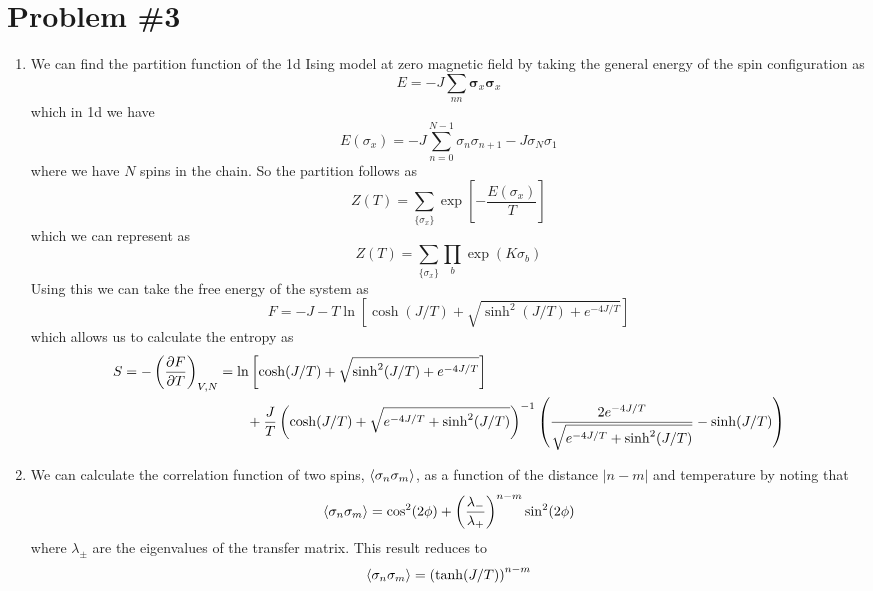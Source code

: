 \documentclass[11pt]{article}
\numberwithin{equation}{section}
\begin{document}
\section{Problem \#3}
\begin{enumerate}[(1)]
\item We can find the partition function of the 1d Ising model at zero magnetic field by taking
the general energy of the spin configuration as
$$E = - J\sum_{nn}\pmb{\sigma}_x\pmb{\sigma}_x$$
which in 1d we have
$$E(\sigma_x) = -J\sum_{n=0}^{N-1}\sigma_{n}\sigma_{n+1}-J\sigma_{N}\sigma_{1}$$
where we have $N$ spins in the chain. So the partition follows as
$$Z(T) = \sum_{\{\sigma_x\}}\exp\left[-\frac{E(\sigma_x)}{T}\right]$$
which we can represent as
$$Z(T) = \sum_{\{\sigma_x\}}\prod_{b}\exp\left(K\sigma_b\right)$$
Using this we can take the free energy of the system as
$$F = -J - T\ln\left[\cosh(J/T)+\sqrt{\sinh^2(J/T)+e^{-4J/T}}\right]$$
which allows us to calculate the entropy as
\begin{align*}
S = -\left(\frac{\partial{F}}{\partial{T}}\right)_{V,N} &= \ln\left[\cosh(J/T)+\sqrt{\sinh^2(J/T)+e^{-4J/T}}\right]\\
&\qquad + \frac{J}{T}\left(\cosh(J/T)+\sqrt{e^{-4J/T}+\sinh^2(J/T)}\right)^{-1}\left(\frac{2e^{-4J/T}}{\sqrt{e^{-4J/T}+\sinh^2(J/T)}}-\sinh(J/T)\right)
\end{align*}

\item We can calculate the  correlation function of two spins, $\left\langle{\sigma_n\sigma_m}\right\rangle$, 
as a function of the distance $|n-m|$ and temperature by noting that 
$$\left\langle{\sigma_n\sigma_m}\right\rangle = \cos^2(2\phi) + \left(\frac{\lambda_{-}}{\lambda_{+}}\right)^{n-m}\sin^2(2\phi)$$
where $\lambda_{\pm}$ are the eigenvalues of the transfer matrix. This result reduces to
$$\left\langle{\sigma_n\sigma_m}\right\rangle = \left(\tanh(J/T)\right)^{n-m}$$


\end{enumerate}
\end{document}
